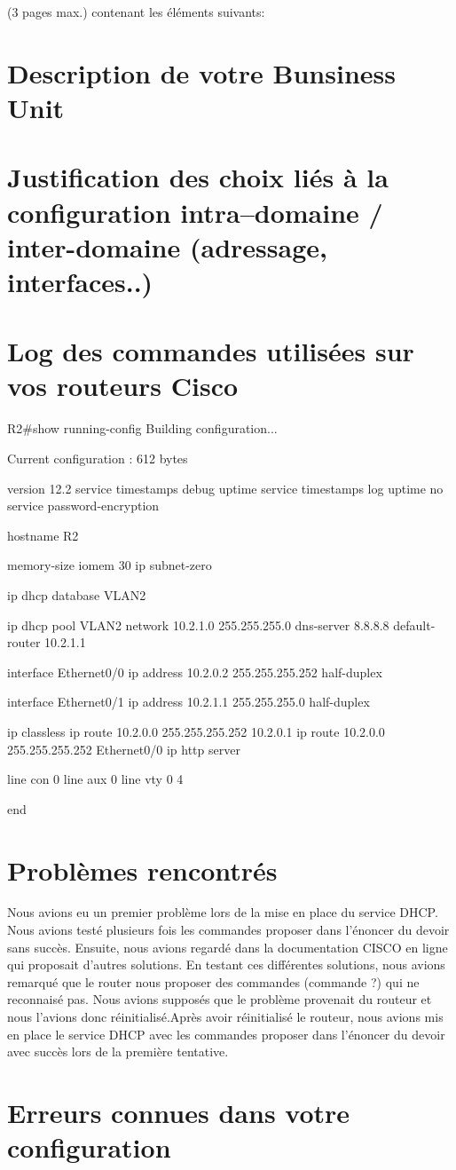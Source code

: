 \documentclass{article}
\author{Benjamain André\\Alexis Lecocp\\Arnaud Collin\\Waelkens Dimitri}
\begin{document}
\Rapport (3 pages max.) contenant les éléments suivants:

\section{Description de votre Bunsiness Unit}

\section{Justification des choix liés à la configuration intra--domaine / inter-domaine (adressage, interfaces..)}

\section{Log des commandes utilisées sur vos routeurs Cisco}

R2#show running-config
Building configuration...

Current configuration : 612 bytes

version 12.2
service timestamps debug uptime
service timestamps log uptime
no service password-encryption

hostname R2

memory-size iomem 30
ip subnet-zero

ip dhcp database VLAN2

ip dhcp pool VLAN2
   network 10.2.1.0 255.255.255.0
   dns-server 8.8.8.8
   default-router 10.2.1.1

interface Ethernet0/0
 ip address 10.2.0.2 255.255.255.252
 half-duplex

interface Ethernet0/1
 ip address 10.2.1.1 255.255.255.0
 half-duplex

ip classless
ip route 10.2.0.0 255.255.255.252 10.2.0.1
ip route 10.2.0.0 255.255.255.252 Ethernet0/0
ip http server

line con 0
line aux 0
line vty 0 4

end

\section{Problèmes rencontrés}

Nous avions eu un premier problème lors de la mise en place du service DHCP. Nous avions testé plusieurs fois les commandes proposer dans l'énoncer du devoir sans succès. Ensuite, nous avions regardé dans la documentation CISCO en ligne qui proposait d'autres solutions.
En testant ces différentes solutions, nous avions remarqué que le router nous proposer des commandes (commande ?) qui ne reconnaisé pas. Nous avions supposés que le problème provenait du routeur et nous l'avions donc réinitialisé.Après avoir réinitialisé le routeur, nous avions mis en place le service DHCP avec les commandes proposer dans l'énoncer du devoir avec succès lors de la première tentative.
\section{Erreurs connues dans votre configuration}
\end{document}
